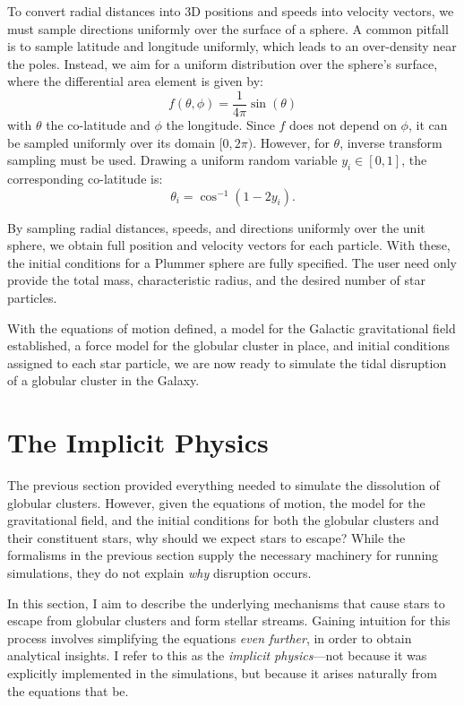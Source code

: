             To convert radial distances into 3D positions and speeds into velocity vectors, we must sample directions uniformly over the surface of a sphere. A common pitfall is to sample latitude and longitude uniformly, which leads to an over-density near the poles. Instead, we aim for a uniform distribution over the sphere's surface, where the differential area element is given by:
            \begin{equation}
                f(\theta,\phi)=\frac{1}{4\pi}\sin(\theta)
            \end{equation} 
            with $\theta$ the co-latitude and $\phi$ the longitude. Since $f$ does not depend on $\phi$, it can be sampled uniformly over its domain $[0, 2\pi)$. However, for $\theta$, inverse transform sampling must be used. Drawing a uniform random variable $y_i \in [0,1]$, the corresponding co-latitude is:
            \begin{equation}
                \theta_i = \cos^{-1}\left(1-2y_i\right).
            \end{equation}

            By sampling radial distances, speeds, and directions uniformly over the unit sphere, we obtain full position and velocity vectors for each particle. With these, the initial conditions for a Plummer sphere are fully specified. The user need only provide the total mass, characteristic radius, and the desired number of star particles.

            With the equations of motion defined, a model for the Galactic gravitational field established, a force model for the globular cluster in place, and initial conditions assigned to each star particle, we are now ready to simulate the tidal disruption of a globular cluster in the Galaxy.



\section{The Implicit Physics}
    The previous section provided everything needed to simulate the dissolution of globular clusters. However, given the equations of motion, the model for the gravitational field, and the initial conditions for both the globular clusters and their constituent stars, why should we expect stars to escape? While the formalisms in the previous section supply the necessary machinery for running simulations, they do not explain \textit{why} disruption occurs.

    In this section, I aim to describe the underlying mechanisms that cause stars to escape from globular clusters and form stellar streams. Gaining intuition for this process involves simplifying the equations \textit{even further}, in order to obtain analytical insights. I refer to this as the \textit{implicit physics}—not because it was explicitly implemented in the simulations, but because it arises naturally from the equations that be.

